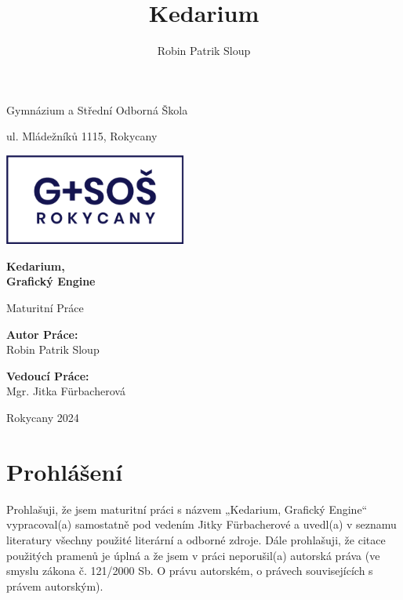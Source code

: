 \documentclass[12pt]{article}
\title{Kedarium}
\author{Robin Patrik Sloup}
\begin{document}
\begin{titlepage}
	\begin{center}
		{\Large Gymnázium a Střední Odborná Škola\par}
		\vspace{0.2cm}
		ul. Mládežníků 1115, Rokycany
	\end{center}
	\begin{center}
		\vspace{1cm}
		\includegraphics[height=3cm]{school-logo.png}\\
	\end{center}
	\vspace*{\fill}
	\begin{center}
		{\Huge \textbf{Kedarium,\\Grafický Engine}\par}
		\vspace{0.3cm}
		{\Large Maturitní Práce\par}
		\vspace{1.5cm}
	\end{center}
	\vspace*{\fill}
	\begin{center}
		\begin{minipage}[t]{0.45\textwidth}
			\centering
			\textbf{Autor Práce:}\\
			Robin Patrik Sloup
		\end{minipage}%
		\begin{minipage}[t]{0.45\textwidth}
			\centering
			\textbf{Vedoucí Práce:}\\
			Mgr. Jitka Fürbacherová
		\end{minipage}
	\end{center}
	\vspace{2cm}
	\begin{center}
		Rokycany 2024
	\end{center}
	\thispagestyle{empty}
\end{titlepage}
\setcounter{page}{2}
\section{Prohlášení}
Prohlašuji, že jsem maturitní práci s názvem „Kedarium, Grafický Engine“ vypracoval(a) samostatně pod vedením Jitky Fürbacherové a uvedl(a) v seznamu literatury všechny použité literární a odborné
zdroje. Dále prohlašuji, že citace použitých pramenů je úplná a že jsem v práci neporušil(a)
autorská práva (ve smyslu zákona č. 121/2000 Sb. O právu autorském, o právech souvisejících
s právem autorským).
\end{document}
